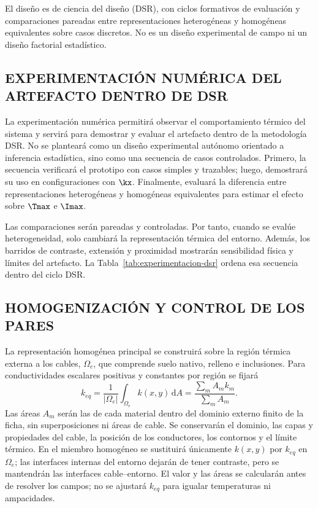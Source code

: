 El diseño es de ciencia del diseño (DSR), con ciclos formativos de evaluación y comparaciones pareadas entre representaciones heterogéneas y homogéneas equivalentes sobre casos discretos. No es un diseño experimental de campo ni un diseño factorial estadístico.

\subsection{EXPERIMENTACIÓN NUMÉRICA DEL ARTEFACTO DENTRO DE DSR}

La experimentación numérica permitirá observar el comportamiento térmico del sistema y servirá para demostrar y evaluar el artefacto dentro de la metodología DSR. No se planteará como un diseño experimental autónomo orientado a inferencia estadística, sino como una secuencia de casos controlados. Primero, la secuencia verificará el prototipo con casos simples y trazables; luego, demostrará su uso en configuraciones con $\kx$. Finalmente, evaluará la diferencia entre representaciones heterogéneas y homogéneas equivalentes para estimar el efecto sobre $\Tmax$ e $\Imax$.

Las comparaciones serán pareadas y controladas. Por tanto, cuando se evalúe heterogeneidad, solo cambiará la representación térmica del entorno. Además, los barridos de contraste, extensión y proximidad mostrarán sensibilidad física y límites del artefacto. La Tabla~\ref{tab:experimentacion-dsr} ordena esa secuencia dentro del ciclo DSR.

\subsection{HOMOGENIZACIÓN Y CONTROL DE LOS PARES}
\label{subsec:homogenizacion}
La representación homogénea principal se construirá sobre la región térmica externa a los cables, $\Omega_e$, que comprende suelo nativo, relleno e inclusiones. Para conductividades escalares positivas y constantes por región se fijará
\begin{equation}
\label{eq:keq-area}
k_{eq}=\frac{1}{|\Omega_e|}\int_{\Omega_e}k(x,y)\,\mathrm{d}A
=\frac{\sum_m A_m k_m}{\sum_m A_m}.
\end{equation}
Las áreas $A_m$ serán las de cada material dentro del dominio externo finito de la ficha, sin superposiciones ni áreas de cable. Se conservarán el dominio, las capas y propiedades del cable, la posición de los conductores, los contornos y el límite térmico. En el miembro homogéneo se sustituirá únicamente $k(x,y)$ por $k_{eq}$ en $\Omega_e$; las interfaces internas del entorno dejarán de tener contraste, pero se mantendrán las interfaces cable--entorno. El valor y las áreas se calcularán antes de resolver los campos; no se ajustará $k_{eq}$ para igualar temperaturas ni ampacidades.

